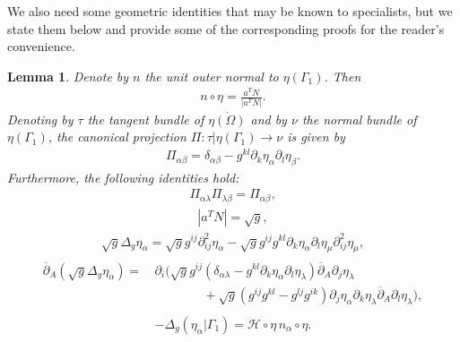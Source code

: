 \documentclass[10pt,reqno]{amsart}
\theoremstyle{plain}
\newtheorem{lemma}[theorem]{Lemma}
\theoremstyle{definition}
\numberwithin{equation}{section}
\newcommand{\cH}{\mathcal H}
\newcommand{\al}{\alpha}
\newcommand{\be}{\beta}
\newcommand{\Ga}{\Gamma}
\newcommand{\de}{\delta}
\newcommand{\la}{\lambda}
\newcommand{\Om}{\Omega}
\newcommand{\rar}{\rightarrow}
\newcommand{\srest}{\mathord{|}}
\begin{document}
We also need some geometric identities that may be known to specialists,
but we state them below and provide some of the corresponding proofs
for the reader's convenience.

\begin{lemma}
\label{lemma_geometric}
Denote by $n$ the unit outer normal to $\eta(\Ga_1)$. Then
\begin{gather}
n\circ \eta = \frac{a^T N}{|a^T N|}.
\label{normal_identity}
\end{gather}
Denoting by $\tau$ the tangent bundle of $\overline{\eta(\Om)}$ and by
$\nu$ the normal bundle of $\eta(\Ga_1)$, the canonical projection
$\Pi\colon \tau \srest \eta(\Ga_1) \rar \nu$ is given by
\begin{gather}
\Pi_{\al\be} = \de_{\al\be} - g^{kl} \partial_k \eta_\al \partial_l \eta_\be.
\label{projection_identity}
\end{gather}
Furthermore, the following identities hold:
\begin{gather}
\Pi_{\al\la} \Pi_{\la\be} = \Pi_{\al\be},
\label{projections_contraction}
\end{gather}
\begin{gather}
|a^T N | = \sqrt{g},
\label{aT_identity}
\end{gather}
\begin{gather}
\sqrt{g} \Delta_g \eta_\al = \sqrt{g} g^{ij}  \partial^2_{ij} \eta_\al 
- \sqrt{g} g^{ij} g^{kl} \partial_k\eta_\al \partial_l \eta_\mu \partial^2_{ij} \eta_\mu,
\label{Laplacian_eta_identity}
\end{gather}
\begin{align}
\begin{split}
\overline{\partial}_A(\sqrt{g} \Delta_g \eta_\al ) 
 = & \, \partial_i \Big( \sqrt{g} g^{ij} (\de_{\al\la} -g^{kl} \partial_k \eta_\al \partial_l \eta_\la)
\overline{\partial}_A \partial_j \eta_\la  
\\
&
\qquad\qquad+ \sqrt{g}(g^{ij} g^{kl} - g^{lj}g^{ik} ) \partial_j \eta_\al \partial_k\eta_\la 
\overline{\partial}_A \partial_l \eta_\la \Big),
\end{split}
\label{partial_Laplacian_eta_identity}
\end{align}
\begin{align}
\begin{split}
-\Delta_g (\eta_\al \srest \Ga_1) = \cH \circ \eta \, n_\al \circ \eta.
\end{split}
\label{formula_mean_curvature_embedding}
\end{align}
\end{lemma}
\end{document}
